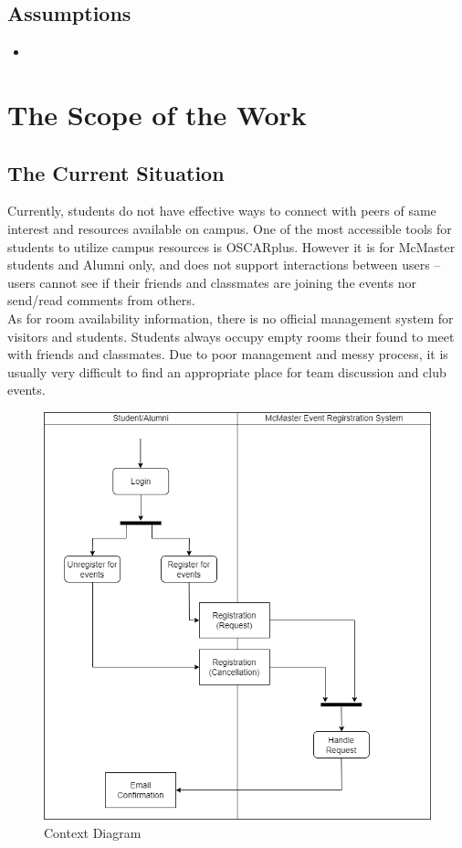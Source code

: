 \documentclass[12pt]{article}
\begin{document}
\subsection{Assumptions}
\begin{itemize}
  \item
\end{itemize}

\section{The Scope of the Work}
\subsection{The Current Situation}
Currently, students do not have effective ways to connect with peers of same interest and resources available on campus.  One of the most accessible tools for students to utilize campus resources is OSCARplus. However it is for McMaster students and Alumni only,  and does not support interactions between users -- users cannot see if their friends and classmates are joining the events nor send/read comments from others. \\
As for room availability information,  there is no official management system for visitors and students.  Students always occupy empty rooms their found to meet with friends and classmates.  Due to poor management and messy process,  it is usually very difficult to find an appropriate place for team discussion and club events.
\begin{figure}[H]
\begin{center}
\includegraphics[scale=0.5]{Current_Situation.png}
\end{center}
\caption{Context Diagram}
\end{figure}
\end{document}
